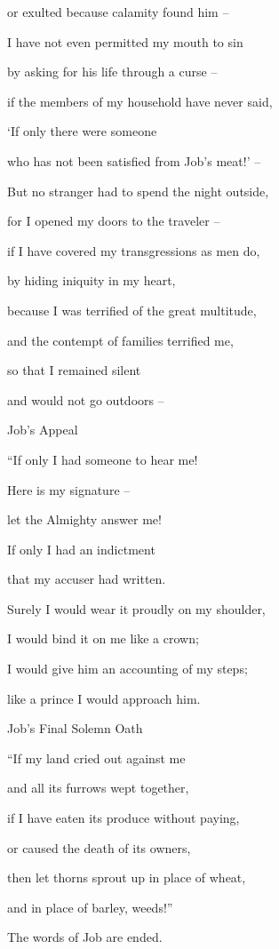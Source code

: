 {\par }{\Q or exulted because
calamity
found him –
\par }{\Q {}I have not
even permitted
my mouth
to sin
\par }{\Q by asking
for his life
through a curse –
\par }{\Q {}if
the members
of my household
have never
said,
\par }{\Q ‘If only there were
someone
\par }{\Q who
has not
been satisfied
from Job’s meat!’ –
\par }{\Q {}But no
stranger
had to spend
the night outside,
\par }{\Q for I opened
my doors
to the traveler –
\par }{\Q {}if
I have covered
my transgressions
as men
do,

\par }{\Q by hiding
iniquity
in my heart,
\par }{\Q {}because
I was terrified
of the great
multitude,
\par }{\Q and the contempt
of families
terrified
me,
\par }{\Q so that I remained silent
\par }{\Q and would not
go
outdoors –

\par }{\SH Job’s Appeal
\par }{\Q {}“If only
I
had someone
to hear
me!
\par }{\Q Here
is my signature –

\par }{\Q let the Almighty answer me!
\par }{\Q If only I had an indictment
\par }{\Q that my accuser had written.
\par }{\Q {}Surely
I would wear it proudly on
my shoulder,
\par }{\Q I would bind
it on me like a crown;
\par }{\Q {}I would give
him an accounting
of my steps;
\par }{\Q like
a prince
I would approach him.
\par }{\SH Job’s Final Solemn Oath
\par }{\Q {}“If
my land
cried out
against
me

\par }{\Q and all its furrows
wept
together,
\par }{\Q {}if
I have
eaten
its
produce without
paying,
\par }{\Q or caused the death of its owners,
\par }{\Q {}then let thorns
sprout up in place
of wheat,
\par }{\Q and in place
of barley,
weeds!”
\par }{\PP The words
of Job are ended.

}
